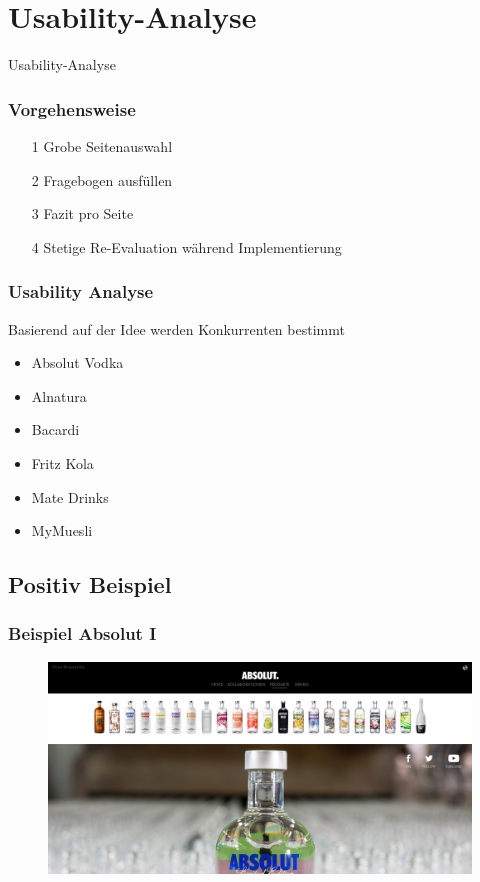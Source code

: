 \section{Usability-Analyse}

\begin{frame}
	\begin{center}
		\huge{Usability-Analyse}
	\end{center}
\end{frame}

\begin{frame}
	\frametitle{Vorgehensweise}
	\begin{itemize}
		\item[1] Grobe Seitenauswahl 
		\item[2] Fragebogen ausfüllen
		\item[3] Fazit pro Seite
		\item[4] Stetige Re-Evaluation während Implementierung
	\end{itemize}
\end{frame}

\begin{frame}
	\frametitle{Usability Analyse}
	Basierend auf der Idee werden Konkurrenten bestimmt
	\begin{itemize}
		\item Absolut Vodka
		\item Alnatura
		\item Bacardi
		\item Fritz Kola
		\item Mate Drinks
		\item MyMuesli
	\end{itemize}
\end{frame}


\subsection{Positiv Beispiel}
\begin{frame}
	\frametitle{Beispiel Absolut I}
	\begin{figure}
	\includegraphics[scale=0.2]{bilder/absolut.png}
	\label{labelname}
	\end{figure}
\end{frame}

